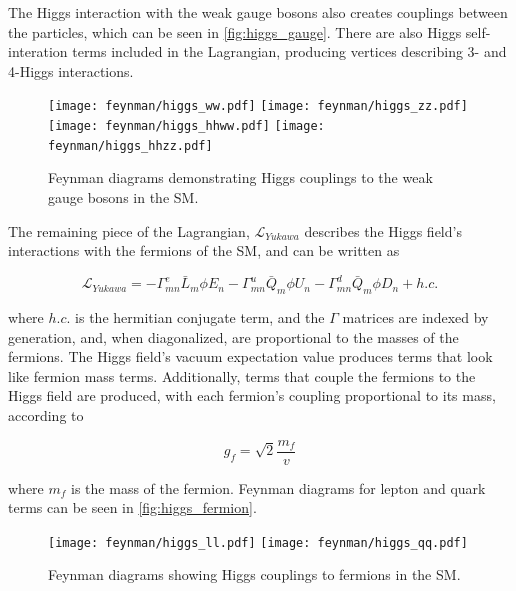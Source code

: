 The Higgs interaction with the weak gauge bosons also creates couplings between the particles, which can be seen in \autoref{fig:higgs_gauge}. There are also Higgs self-interation terms included in the Lagrangian, producing vertices describing 3- and 4-Higgs interactions. 

\begin{centering}
\begin{figure}[!hbt]
\myfloatalign
\texttt{[image: feynman/higgs\_ww.pdf]}
\texttt{[image: feynman/higgs\_zz.pdf]}
\texttt{[image: feynman/higgs\_hhww.pdf]}
\texttt{[image: feynman/higgs\_hhzz.pdf]}
\caption{Feynman diagrams demonstrating Higgs couplings to the weak gauge bosons in the \ac{SM}.}
\label{fig:higgs_gauge}
\end{figure}
\end{centering}

The remaining piece of the Lagrangian, $\mathcal{L}_{Yukawa}$ describes the Higgs field's interactions with the fermions of the \ac{SM}, and can be written as

\begin{equation}
\mathcal{L}_{Yukawa} = -\Gamma^e_{mn}\bar{L}_m \phi E_n -\Gamma^u_{mn}\bar{Q}_m \phi U_n -\Gamma^d_{mn}\bar{Q}_m \phi D_n + h.c.
\end{equation} 

where $h.c.$ is the hermitian conjugate term, and the $\Gamma$ matrices are indexed by generation, and, when diagonalized, are proportional to the masses of the fermions. The Higgs field's vacuum expectation value produces terms that look like fermion mass terms. Additionally, terms that couple the fermions to the Higgs field are produced, with each fermion's coupling proportional to its mass, according to 

\begin{equation}
g_{f} = \sqrt{2}\frac{m_f}{v}
\end{equation}

where $m_f$ is the mass of the fermion. Feynman diagrams for lepton and quark terms can be seen in \autoref{fig:higgs_fermion}.

 \begin{centering}
\begin{figure}[!hbt]
\myfloatalign
\texttt{[image: feynman/higgs\_ll.pdf]}
\texttt{[image: feynman/higgs\_qq.pdf]}
\caption{Feynman diagrams showing Higgs couplings to fermions in the \ac{SM}.}
\label{fig:higgs_fermion}
\end{figure}
\end{centering}

